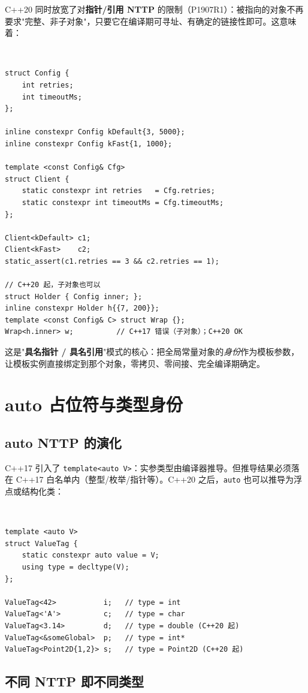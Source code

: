 \documentclass[12pt,a4paper,fontset=fandol]{ctexbook}
\newcommand{\cppxxlabel}[1]{%
  \tcbox[on line,colback=cpp20bg,colframe=cpp20bg,
    boxrule=0pt,arc=1pt,left=2pt,right=2pt,top=1pt,bottom=1pt,
    colupper=white,fontupper=\scriptsize\bfseries]{#1}}
\newcommand{\cpp}[1]{C++#1}
\newcommand{\kw}[1]{\texttt{#1}}
\begin{document}
\cpp{20} 同时放宽了对\textbf{指针/引用 NTTP} 的限制（P1907R1）：被指向的对象不再要求"完整、非子对象"，只要它在编译期可寻址、有确定的链接性即可。这意味着：

\cppxxlabel{C++20}\ \begin{lstlisting}
struct Config {
    int retries;
    int timeoutMs;
};

inline constexpr Config kDefault{3, 5000};
inline constexpr Config kFast{1, 1000};

template <const Config& Cfg>
struct Client {
    static constexpr int retries   = Cfg.retries;
    static constexpr int timeoutMs = Cfg.timeoutMs;
};

Client<kDefault> c1;
Client<kFast>    c2;
static_assert(c1.retries == 3 && c2.retries == 1);

// C++20 起，子对象也可以
struct Holder { Config inner; };
inline constexpr Holder h{{7, 200}};
template <const Config& C> struct Wrap {};
Wrap<h.inner> w;          // C++17 错误（子对象）；C++20 OK
\end{lstlisting}

这是"\textbf{具名指针 / 具名引用}"模式的核心：把全局常量对象的\emph{身份}作为模板参数，让模板实例直接绑定到那个对象，零拷贝、零间接、完全编译期确定。

\chapter{auto 占位符与类型身份}

\section{auto NTTP 的演化}

\cpp{17} 引入了 \kw{template<auto V>}：实参类型由编译器推导。但推导结果必须落在 \cpp{17} 白名单内（整型/枚举/指针等）。\cpp{20} 之后，\kw{auto} 也可以推导为浮点或结构化类：

\cppxxlabel{C++20}\ \begin{lstlisting}
template <auto V>
struct ValueTag {
    static constexpr auto value = V;
    using type = decltype(V);
};

ValueTag<42>           i;   // type = int
ValueTag<'A'>          c;   // type = char
ValueTag<3.14>         d;   // type = double (C++20 起)
ValueTag<&someGlobal>  p;   // type = int*
ValueTag<Point2D{1,2}> s;   // type = Point2D (C++20 起)
\end{lstlisting}

\section{不同 NTTP 即不同类型}
\end{document}
